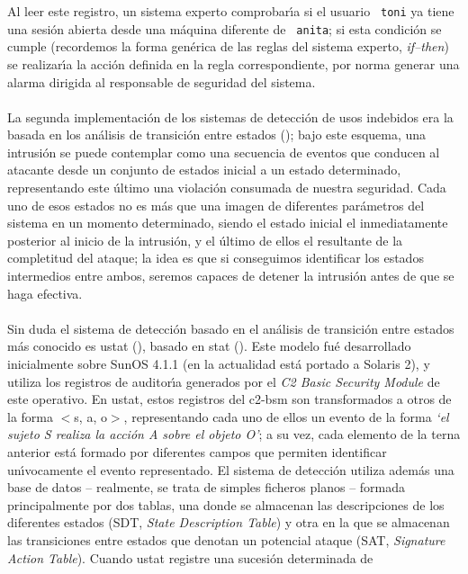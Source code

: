 Al leer este registro, un sistema experto comprobar\'{\i}a si el usuario {\tt
toni} ya tiene una sesi\'on abierta desde una m\'aquina diferente de {\tt 
anita}; si esta condici\'on se cumple (recordemos la forma gen\'erica de las
reglas del sistema experto, {\it if--then}) se realizar\'{\i}a la acci\'on 
definida en la regla correspondiente, por norma generar una alarma dirigida al
responsable de seguridad del sistema.\\
\\La segunda implementaci\'on de los sistemas de detecci\'on de usos indebidos 
era la basada en los an\'alisis de transici\'on entre estados (\cite{kn:por92});
bajo este esquema, una intrusi\'on se puede contemplar como una secuencia de
eventos que conducen al atacante desde un conjunto de estados inicial a un 
estado determinado, representando este \'ultimo una violaci\'on
consumada de nuestra seguridad. Cada uno de esos estados no es m\'as que una
imagen de diferentes par\'ametros del sistema en un momento determinado, siendo
el estado inicial el inmediatamente posterior al inicio de la intrusi\'on, y el
\'ultimo de ellos el resultante de la completitud del ataque; la idea es que 
si conseguimos identificar los estados intermedios entre ambos, seremos capaces
de detener la intrusi\'on antes de que se haga efectiva.\\
\\Sin duda el sistema de detecci\'on basado en el an\'alisis de transici\'on
entre estados m\'as conocido es {\sc ustat} (\cite{kn:il93}), basado en {\sc 
stat} (\cite{kn:por92a}). Este modelo fu\'e desarrollado inicialmente sobre 
SunOS 4.1.1 (en la actualidad est\'a portado a Solaris 2), y utiliza los 
registros de auditor\'{\i}a ge\-ne\-ra\-dos por el {\it C2 Basic Security 
Module} de este operativo. En {\sc ustat}, estos registros del {\sc c2-bsm} son 
transformados a otros de la forma {\sc $<$s, a, o$>$}, representando cada uno 
de ellos un evento de la forma {\it `el sujeto S realiza la acci\'on A sobre el 
objeto O'}; a su vez, cada elemento de la terna anterior est\'a formado por
diferentes campos que permiten identificar un\'{\i}vocamente el evento 
representado. El sistema de detecci\'on utiliza adem\'as una base de datos --
realmente, se trata de simples ficheros planos -- formada principalmente por 
dos tablas, una donde se almacenan las descripciones de los diferentes estados 
(SDT, {\it State Description Table}) y otra en la que se almacenan las 
transiciones entre estados que denotan un potencial ataque (SAT, {\it Signature 
Action Table}). Cuando {\sc ustat} registre una sucesi\'on determinada de
